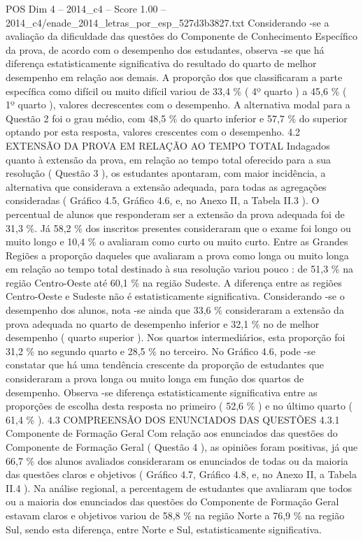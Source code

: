 \begin{textsample}{POS Dim 4 – 2014\_c4 – Score 1.00 – 2014\_c4/enade\_2014\_letras\_por\_esp\_527d3b3827.txt}
Considerando -se a avaliação da dificuldade das questões do Componente de Conhecimento Específico da prova, de acordo com o desempenho dos estudantes, observa -se que há diferença estatisticamente significativa do resultado do quarto de melhor desempenho em relação aos demais.
A proporção dos que classificaram a parte específica como difícil ou muito difícil variou de 33,4 \% ( 4º quarto ) a 45,6 \% ( 1º quarto ), valores decrescentes com o desempenho.
A alternativa modal para a Questão 2 foi o grau médio, com 48,5 \% do quarto inferior e 57,7 \% do superior optando por esta resposta, valores crescentes com o desempenho. 4.2 EXTENSÃO DA PROVA EM RELAÇÃO AO TEMPO TOTAL Indagados quanto à extensão da prova, em relação ao tempo total oferecido para a sua resolução ( Questão 3 ), os estudantes apontaram, com maior incidência, a alternativa que considerava a extensão adequada, para todas as agregações consideradas ( Gráfico 4.5, Gráfico 4.6, e, no Anexo II, a Tabela II.3 ).
O percentual de alunos que responderam ser a extensão da prova adequada foi de 31,3 \%.
Já 58,2 \% dos inscritos presentes consideraram que o exame foi longo ou muito longo e 10,4 \% o avaliaram como curto ou muito curto.
Entre as Grandes Regiões a proporção daqueles que avaliaram a prova como longa ou muito longa em relação ao tempo total destinado à sua resolução variou pouco : de 51,3 \% na região Centro-Oeste até 60,1 \% na região Sudeste.
A diferença entre as regiões Centro-Oeste e Sudeste não é estatisticamente significativa.
Considerando -se o desempenho dos alunos, nota -se ainda que 33,6 \% consideraram a extensão da prova adequada no quarto de desempenho inferior e 32,1 \% no de melhor desempenho ( quarto superior ).
Nos quartos intermediários, esta proporção foi 31,2 \% no segundo quarto e 28,5 \% no terceiro.
No Gráfico 4.6, pode -se constatar que há uma tendência crescente da proporção de estudantes que consideraram a prova longa ou muito longa em função dos quartos de desempenho.
Observa -se diferença estatisticamente significativa entre as proporções de escolha desta resposta no primeiro ( 52,6 \% ) e no último quarto ( 61,4 \% ). 4.3 COMPREENSÃO DOS ENUNCIADOS DAS QUESTÕES 4.3.1 Componente de Formação Geral Com relação aos enunciados das questões do Componente de Formação Geral ( Questão 4 ), as opiniões foram positivas, já que 66,7 \% dos alunos avaliados consideraram os enunciados de todas ou da maioria das questões claros e objetivos ( Gráfico 4.7, Gráfico 4.8, e, no Anexo II, a Tabela II.4 ).
Na análise regional, a percentagem de estudantes que avaliaram que todos ou a maioria dos enunciados das questões do Componente de Formação Geral estavam claros e objetivos variou de 58,8 \% na região Norte a 76,9 \% na região Sul, sendo esta diferença, entre Norte e Sul, estatisticamente significativa.

\end{textsample}
